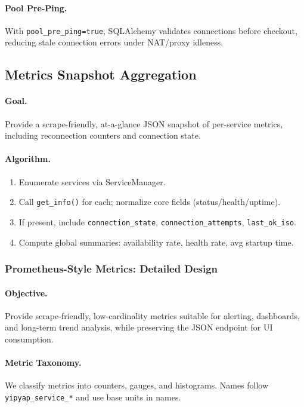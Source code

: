\documentclass[11pt]{article}
\begin{document}
\paragraph{Pool Pre-Ping.} With \texttt{pool\_pre\_ping=true}, SQLAlchemy validates connections before checkout, reducing stale connection errors under NAT/proxy idleness.

\subsection{Metrics Snapshot Aggregation}

\paragraph{Goal.} Provide a scrape-friendly, at-a-glance JSON snapshot of per-service metrics, including reconnection counters and connection state.

\paragraph{Algorithm.}
\begin{enumerate}[nosep]
  \item Enumerate services via ServiceManager.
  \item Call \texttt{get\_info()} for each; normalize core fields (status/health/uptime).
  \item If present, include \texttt{connection\_state}, \texttt{connection\_attempts}, \texttt{last\_ok\_iso}.
  \item Compute global summaries: availability rate, health rate, avg startup time.
\end{enumerate}

\subsubsection{Prometheus-Style Metrics: Detailed Design}

\paragraph{Objective.} Provide scrape-friendly, low-cardinality metrics suitable for alerting, dashboards, and long-term trend analysis, while preserving the JSON endpoint for UI consumption.

\paragraph{Metric Taxonomy.} We classify metrics into counters, gauges, and histograms. Names follow \texttt{yipyap\_service\_*} and use base units in names.
\end{document}
